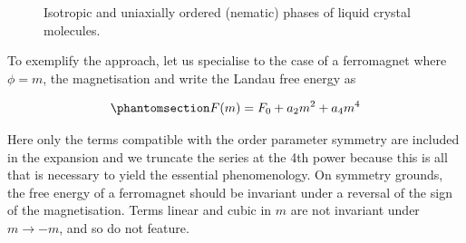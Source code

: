 \documentclass[
  letterpaper,
  enabledeprecatedfontcommands]{report}
\begin{document}
\begin{tcolorbox}
\begin{figure}[H]
\begin{minipage}{0.50\linewidth}
\end{minipage}%
%
\begin{minipage}{0.50\linewidth}



\end{minipage}%

\caption{\label{fig-mfsum}Isotropic and uniaxially ordered (nematic)
phases of liquid crystal molecules.}

\end{figure}%

\end{tcolorbox}

To exemplify the approach, let us specialise to the case of a
ferromagnet where \(\phi=m\), the magnetisation and write the Landau
free energy as

\begin{equation}\phantomsection\label{eq-landau}{
F(m)=F_0+a_2m^2+a_4m^4
}\end{equation}

Here only the terms compatible with the order parameter symmetry are
included in the expansion and we truncate the series at the 4th power
because this is all that is necessary to yield the essential
phenomenology. On symmetry grounds, the free energy of a ferromagnet
should be invariant under a reversal of the sign of the magnetisation.
Terms linear and cubic in \(m\) are not invariant under \(m\to -m\), and
so do not feature.
\end{document}
